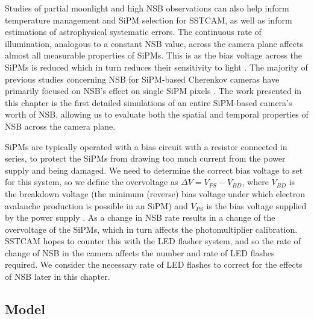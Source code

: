 Studies of partial moonlight and high NSB observations can also help inform temperature management and SiPM selection for SSTCAM, as well as inform estimations of astrophysical systematic errors. The continuous rate of illumination, analogous to a constant NSB value, across the camera plane affects almost all measurable properties of SiPMs. This is as the bias voltage across the SiPMs is reduced which in turn reduces their sensitivity to light \cite{1mhighnsb}. The majority of previous studies concerning NSB for SiPM-based Cherenkov cameras have primarily focused on NSB's effect on single SiPM pixels \cite{2msipm} \cite{1mcalib} \cite{1mhighnsb} \cite{lstnsb}. The work presented in this chapter is the first detailed simulations of an entire SiPM-based camera's worth of NSB, allowing us to evaluate both the spatial and temporal properties of NSB across the camera plane.

SiPMs are typically operated with a bias circuit with a resistor connected in series, to protect the SiPMs from drawing too much current from the power supply and being damaged. We need to determine the correct bias voltage to set for this system, so we define the overvoltage as $\Delta V=V_{PS}-V_{BD}$, where $V_{BD}$ is the breakdown voltage (the minimum (reverse) bias voltage under which electron avalanche production is possible in an SiPM) and $V_{PS}$ is the bias voltage supplied by the power supply \cite{1mhighnsb}. As a change in NSB rate results in a change of the overvoltage of the SiPMs, which in turn affects the photomultiplier calibration. SSTCAM hopes to counter this with the LED flasher system, and so the rate of change of NSB in the camera affects the number and rate of LED flashes required. We consider the necessary rate of LED flashes to correct for the effects of NSB later in this chapter.
\subsection{Model}
\label{sec:intro:model}

